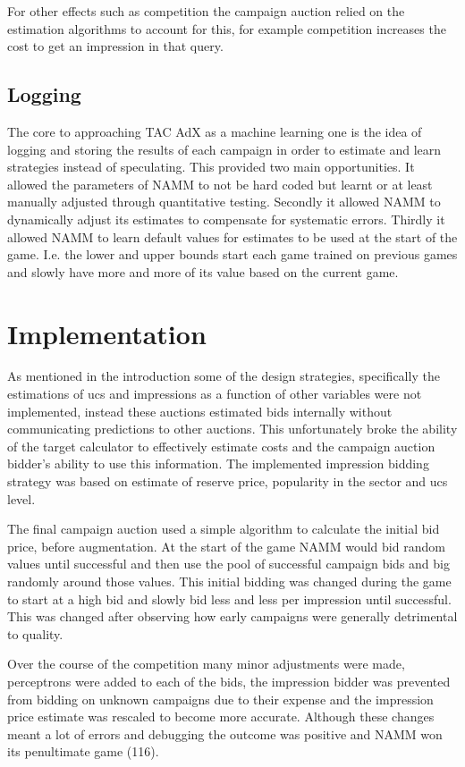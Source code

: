 \documentclass{sig-alternate-05-2015}
\begin{document}
For other effects such as competition the campaign auction relied on the estimation algorithms to account for this, for example competition increases the cost to get an impression in that query. 

\subsection{Logging}
The core to approaching TAC AdX as a machine learning one is the idea of logging and storing the results of each campaign in order to estimate and learn strategies instead of speculating. This provided two main opportunities. It allowed the parameters of NAMM to not be hard coded but learnt or at least manually adjusted through quantitative testing. Secondly it allowed NAMM to dynamically adjust its estimates to compensate for systematic errors. Thirdly it allowed NAMM to learn default values for estimates to be used at the start of the game. I.e. the lower and upper bounds start each game trained on previous games and slowly have more and more of its value based on the current game.  
\section{Implementation}
As mentioned in the introduction some of the design strategies, specifically the estimations of ucs and impressions as a function of other variables were not implemented, instead these auctions estimated bids internally without communicating predictions to other auctions. 
This unfortunately broke the ability of the target calculator to effectively estimate costs and the campaign auction bidder's ability to use this information. The implemented impression bidding strategy was based on estimate of reserve price, popularity in the sector and ucs level. 

The final campaign auction used a simple algorithm to calculate the initial bid price, before augmentation. At the start of the game NAMM would bid random values until successful and then use the pool of successful campaign bids and big randomly around those values. This initial bidding was changed during the game to start at a high bid and slowly bid less and less per impression until successful. This was changed after observing how early campaigns were generally detrimental to quality. 

Over the course of the competition many minor adjustments were made, perceptrons were added to each of the bids, the impression bidder was prevented from bidding on unknown campaigns due to their expense and the impression price estimate was rescaled to become more accurate. Although these changes meant a lot of errors and debugging the outcome was positive and NAMM won its penultimate game (116).
\end{document}
